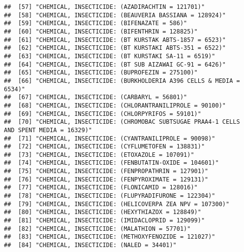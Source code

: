 \documentclass[
]{article}
\begin{document}
\begin{verbatim}
##  [57] "CHEMICAL, INSECTICIDE: (AZADIRACHTIN = 121701)"                                    
##  [58] "CHEMICAL, INSECTICIDE: (BEAUVERIA BASSIANA = 128924)"                              
##  [59] "CHEMICAL, INSECTICIDE: (BIFENAZATE = 586)"                                         
##  [60] "CHEMICAL, INSECTICIDE: (BIFENTHRIN = 128825)"                                      
##  [61] "CHEMICAL, INSECTICIDE: (BT KURSTAK ABTS-1857 = 6523)"                              
##  [62] "CHEMICAL, INSECTICIDE: (BT KURSTAKI ABTS-351 = 6522)"                              
##  [63] "CHEMICAL, INSECTICIDE: (BT KURSTAKI SA-11 = 6519)"                                 
##  [64] "CHEMICAL, INSECTICIDE: (BT SUB AIZAWAI GC-91 = 6426)"                              
##  [65] "CHEMICAL, INSECTICIDE: (BUPROFEZIN = 275100)"                                      
##  [66] "CHEMICAL, INSECTICIDE: (BURKHOLDERIA A396 CELLS & MEDIA = 6534)"                   
##  [67] "CHEMICAL, INSECTICIDE: (CARBARYL = 56801)"                                         
##  [68] "CHEMICAL, INSECTICIDE: (CHLORANTRANILIPROLE = 90100)"                              
##  [69] "CHEMICAL, INSECTICIDE: (CHLORPYRIFOS = 59101)"                                     
##  [70] "CHEMICAL, INSECTICIDE: (CHROMOBAC SUBTSUGAE PRAA4-1 CELLS AND SPENT MEDIA = 16329)"
##  [71] "CHEMICAL, INSECTICIDE: (CYANTRANILIPROLE = 90098)"                                 
##  [72] "CHEMICAL, INSECTICIDE: (CYFLUMETOFEN = 138831)"                                    
##  [73] "CHEMICAL, INSECTICIDE: (ETOXAZOLE = 107091)"                                       
##  [74] "CHEMICAL, INSECTICIDE: (FENBUTATIN-OXIDE = 104601)"                                
##  [75] "CHEMICAL, INSECTICIDE: (FENPROPATHRIN = 127901)"                                   
##  [76] "CHEMICAL, INSECTICIDE: (FENPYROXIMATE = 129131)"                                   
##  [77] "CHEMICAL, INSECTICIDE: (FLONICAMID = 128016)"                                      
##  [78] "CHEMICAL, INSECTICIDE: (FLUPYRADIFURONE = 122304)"                                 
##  [79] "CHEMICAL, INSECTICIDE: (HELICOVERPA ZEA NPV = 107300)"                             
##  [80] "CHEMICAL, INSECTICIDE: (HEXYTHIAZOX = 128849)"                                     
##  [81] "CHEMICAL, INSECTICIDE: (IMIDACLOPRID = 129099)"                                    
##  [82] "CHEMICAL, INSECTICIDE: (MALATHION = 57701)"                                        
##  [83] "CHEMICAL, INSECTICIDE: (METHOXYFENOZIDE = 121027)"                                 
##  [84] "CHEMICAL, INSECTICIDE: (NALED = 34401)"                                            

\end{verbatim}
\end{document}
